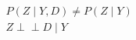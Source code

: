﻿\documentclass{article}
\begin{document}
\begin{preview}
\(\displaystyle
\begin{gathered}
  P(Z\mid Y,D)\neq P(Z\mid Y) \\
  Z \perp\!\!\!\perp D \mid Y
\end{gathered}
\)
\end{preview}
\end{document}
